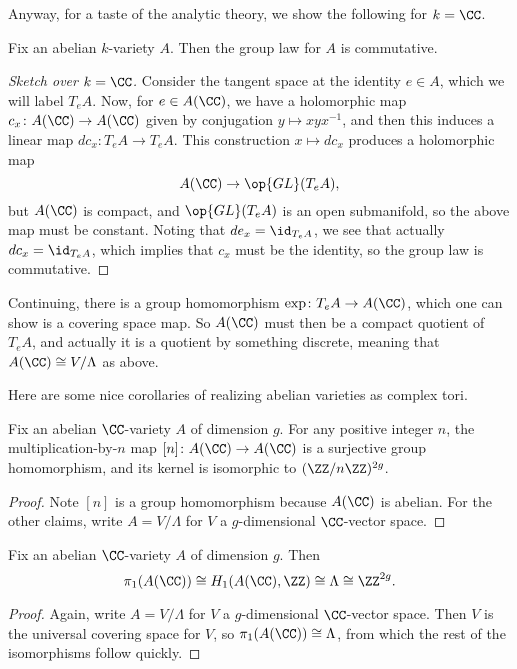 \documentclass[../notes.tex]{subfiles}
\begin{document}
Anyway, for a taste of the analytic theory, we show the following for $k=\CC$.
\begin{proposition}
	Fix an abelian $k$-variety $A$. Then the group law for $A$ is commutative.
\end{proposition}
\begin{proof}[Sketch over $k=\CC$]
	Consider the tangent space at the identity $e\in A$, which we will label $T_eA$. Now, for $e\in A(\CC)$, we have a holomorphic map $c_x\colon A(\CC)\to A(\CC)$ given by conjugation $y\mapsto xyx^{-1}$, and then this induces a linear map $dc_x\colon T_eA\to T_eA$. This construction $x\mapsto dc_x$ produces a holomorphic map
	\[A(\CC)\to\op{GL}(T_eA),\]
	but $A(\CC)$ is compact, and $\op{GL}(T_eA)$ is an open submanifold, so the above map must be constant. Noting that $de_x=\id_{T_eA}$, we see that actually $dc_x=\id_{T_eA}$, which implies that $c_x$ must be the identity, so the group law is commutative.
\end{proof}
\begin{remark} \label{rem:ab-var-is-torus}
	Continuing, there is a group homomorphism $\exp\colon T_eA\to A(\CC)$, which one can show is a covering space map. So $A(\CC)$ must then be a compact quotient of $T_eA$, and actually it is a quotient by something discrete, meaning that $A(\CC)\cong V/\Lambda$ as above.
\end{remark}
Here are some nice corollaries of realizing abelian varieties as complex tori.
\begin{corollary} \label{cor:mul-by-n-iso}
	Fix an abelian $\CC$-variety $A$ of dimension $g$. For any positive integer $n$, the multiplication-by-$n$ map $[n]\colon A(\CC)\to A(\CC)$ is a surjective group homomorphism, and its kernel is isomorphic to $(\ZZ/n\ZZ)^{2g}$.
\end{corollary}
\begin{proof}
	Note $[n]$ is a group homomorphism because $A(\CC)$ is abelian. For the other claims, write $A=V/\Lambda$ for $V$ a $g$-dimensional $\CC$-vector space.
\end{proof}
\begin{corollary}
	Fix an abelian $\CC$-variety $A$ of dimension $g$. Then
	\[\pi_1(A(\CC))\cong H_1(A(\CC),\ZZ)\cong\Lambda\cong\ZZ^{2g}.\]
\end{corollary}
\begin{proof}
	Again, write $A=V/\Lambda$ for $V$ a $g$-dimensional $\CC$-vector space. Then $V$ is the universal covering space for $V$, so $\pi_1(A(\CC))\cong\Lambda$, from which the rest of the isomorphisms follow quickly.
\end{proof}
\end{document}
